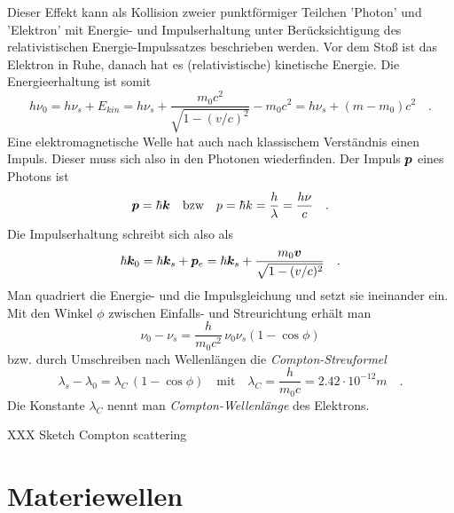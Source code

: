  Dieser Effekt kann als Kollision zweier punktförmiger Teilchen 'Photon' und 'Elektron' mit Energie- und Impulserhaltung unter Berücksichtigung des relativistischen Energie-Impulssatzes beschrieben werden. Vor dem Stoß ist das Elektron in Ruhe, danach hat es (relativistische) kinetische Energie. Die Energieerhaltung ist somit
\begin{equation}
    h \nu_0 = h \nu_s + E_{kin} = h \nu_s + \frac{m_0 c^2}{\sqrt{1 - (v/c)^2}} - m_0 c^2 = h \nu_s + (m - m_0) c^2 \quad .
\end{equation}
Eine elektromagnetische Welle hat auch nach klassischem Verständnis einen Impuls. Dieser muss sich also in den Photonen wiederfinden. Der Impuls $\boldsymbol{p}$ eines Photons ist 
\begin{equation}
    \boldsymbol{p} = \hbar \boldsymbol{k} \quad \text{bzw} \quad p = \hbar k = \frac{h}{\lambda} = \frac{h \nu}{c} \quad .
    \label{eq:2_impuls_photon}
\end{equation}
Die Impulserhaltung schreibt sich also als
\begin{equation}
    \hbar \boldsymbol{k}_0 = \hbar \boldsymbol{k}_s + \boldsymbol{p}_e = \hbar \boldsymbol{k}_s + \frac{m_0 \boldsymbol{v}}{\sqrt{1 - (v/c)^2}} \quad .
\end{equation}
Man quadriert die Energie- und die Impulsgleichung und setzt sie ineinander ein. Mit den Winkel $\phi$ zwischen Einfalls- und Streurichtung erhält man
\begin{equation}
    \nu_0 - \nu_s = \frac{h}{m_0 c^2} \, \nu_0 \nu_s (1 - \cos \phi)
\end{equation}
bzw. durch Umschreiben nach Wellenlängen die \emph{Compton-Streuformel}
\begin{equation}
    \lambda_s - \lambda_0 =  \lambda_C \, (1 - \cos \phi) \quad \text{mit} \quad
    \lambda_C = \frac{h}{m_0 c} = 2.42 \cdot 10^{-12} m \quad .
\end{equation}
Die Konstante $\lambda_C$ nennt man \emph{Compton-Wellenlänge} des Elektrons.


\begin{marginfigure}
    \caption{XXX Sketch Compton scattering}
\end{marginfigure}



 \section{Materiewellen}

